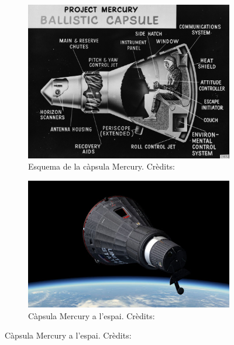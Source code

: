 \begin{figure}[ht]
    \centering
    \begin{subfigure}{.5\textwidth}
        \centering
        \includegraphics[width=0.75\linewidth]{imagenes/09_mercury_graficas/mercury_capsule.jpg}
        \caption{{Esquema de la càpsula Mercury. Crèdits: \cite{mercury_capsule}}}
    \end{subfigure}%
    \begin{subfigure}{.5\textwidth}
        \centering
        \includegraphics[width=0.75\linewidth]{imagenes/09_mercury_graficas/mercury_capsule_space.jpg}
        \caption{{Càpsula Mercury a l'espai. Crèdits: \cite{mercury_capsule_space}}}
    \end{subfigure}
\end{figure}


